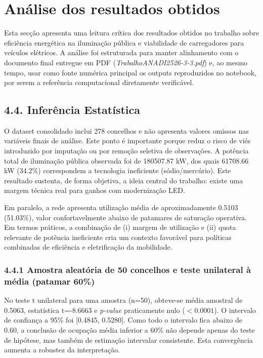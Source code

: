 \section{Análise dos resultados obtidos}

Esta secção apresenta uma leitura crítica dos resultados obtidos no trabalho sobre eficiência energética na iluminação pública e viabilidade de carregadores para veículos elétricos. A análise foi estruturada para manter alinhamento com o documento final entregue em PDF (\textit{TrabalhoANADI2526-3-3.pdf}) e, ao mesmo tempo, usar como fonte numérica principal os outputs reproduzidos no notebook, por serem a referência computacional diretamente verificável.

\subsection{4.4. Inferência Estatística}

O dataset consolidado inclui 278 concelhos e não apresenta valores omissos nas variáveis finais de análise. Este ponto é importante porque reduz o risco de viés introduzido por imputação ou por remoção seletiva de observações. A potência total de iluminação pública observada foi de 180507.87 kW, dos quais 61708.66 kW (34.2\%) correspondem a tecnologia ineficiente (sódio/mercúrio). Este resultado sustenta, de forma objetiva, a ideia central do trabalho: existe uma margem técnica real para ganhos com modernização LED.

Em paralelo, a rede apresenta utilização média de aproximadamente 0.5103 (51.03\%), valor confortavelmente abaixo de patamares de saturação operativa. Em termos práticos, a combinação de (i) margem de utilização e (ii) quota relevante de potência ineficiente cria um contexto favorável para políticas combinadas de eficiência e eletrificação da mobilidade.

\subsubsection{4.4.1 Amostra aleatória de 50 concelhos e teste unilateral à média (patamar 60\%)}
No teste t unilateral para uma amostra (n=50), obteve-se média amostral de 0.5063, estatística t=-8.6663 e \textit{p-value} praticamente nulo (\(<0.0001\)). O intervalo de confiança a 95\% foi [0.4845, 0.5280]. Como todo o intervalo fica abaixo de 0.60, a conclusão de ocupação média inferior a 60\% não depende apenas do teste de hipótese, mas também de estimação intervalar consistente. Esta convergência aumenta a robustez da interpretação.

